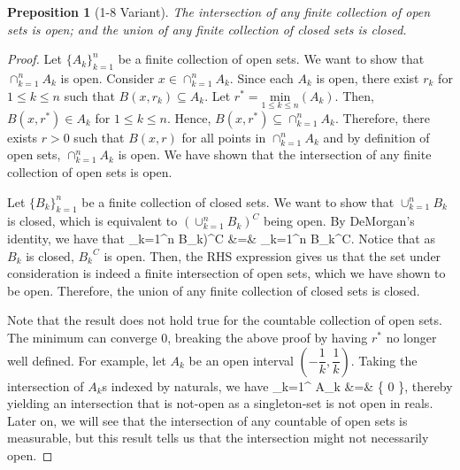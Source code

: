 \documentclass{article} %
\def\eQb#1\eQe{\begin{eqnarray*}#1\end{eqnarray*}}
\theoremstyle{quest}
\newtheorem*{preposition}{Preposition}
\begin{document}
\bigskip

\begin{preposition}[1-8 Variant]
The intersection of any finite collection of open sets is open; and the union of any finite
collection of closed sets is closed.
\end{preposition}
\begin{proof} Let $\{ A_k \}_{k=1}^{n}$ be a finite collection of open sets. We want to show
that $\cap_{k=1}^{n} A_k$ is open. Consider $x \in \cap_{k=1}^{n} A_k$. Since each $A_k$ is open, 
there exist $r_k$ for $1 \leq k \leq n$ such that $B(x,r_k) \subseteq A_k$. Let $r^* = 
\underset{1 \leq k 
\leq n}{\text{min}}( A_k )$. Then, $B(x,r^*) \in A_k$ for $1 \leq k \leq n$. Hence,
$B(x,r^*) \subseteq \cap_{k=1}^{n} A_k$. Therefore, there exists $r > 0$ such that
$B(x,r)$ for all points in $\cap_{k=1}^{n} A_k$ and by definition of open sets,
$\cap_{k=1}^{n} A_k$ is open. 
We have shown that the intersection of any finite collection of open sets is open. \\

\smallskip

Let $\{ B_k \}_{k=1}^{n}$ be a finite
collection of closed sets. We want to show that $\cup_{k=1}^{n} B_k$ is closed, which is 
equivalent to $(\cup_{k=1}^{n} B_k)^{C}$ being open. By DeMorgan's identity, we have that
\eQb
(\cup_{k=1}^{n} B_k)^{C} &=& \cap_{k=1}^{n} {B_k}^{C}.
\eQe
Notice that as $B_k$ is closed, ${B_k}^{C}$ is open. Then, 
the RHS expression gives us that the set under consideration is indeed a finite
intersection of open sets, which we have shown to be open. Therefore, the union 
of any finite collection of closed sets is closed. \\

\smallskip

Note that the result does not hold true for the countable collection of open sets. The minimum can
converge $0$, breaking the above proof by having $r^*$ no longer well defined. For example,
let $A_k$ be an open interval $(-\dfrac{1}{k}, \dfrac{1}{k})$. Taking the intersection of $A_k$s 
indexed by naturals, we have 
\eQb
\cap_{k=1}^{\infty} A_k &=& \{ 0 \},
\eQe
thereby yielding an intersection that is not-open as a singleton-set is not open in reals.
Later on, we will see that the intersection of any countable of open sets is
measurable, but this result
tells us that the intersection might not necessarily open.
\end{proof}

\bigskip
\end{document}
